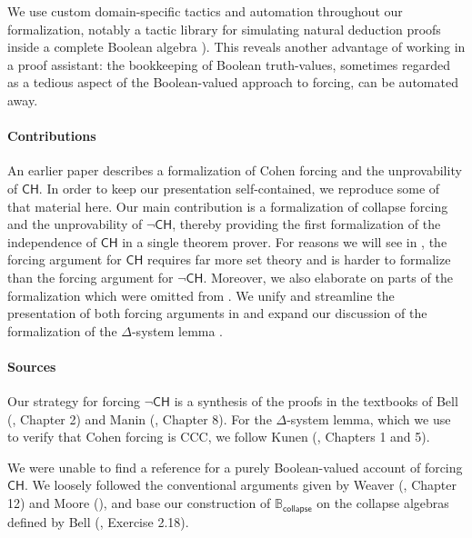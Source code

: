 \documentclass[sigplan,10pt,review, anonymous]{acmart}
\newcommand{\CH}{\mathsf{CH}}
\theoremstyle{definition}
\begin{document}
We use custom domain-specific tactics and automation throughout our formalization, notably a tactic library for simulating natural deduction proofs inside a complete Boolean algebra ). This reveals another advantage of working in a proof assistant: the bookkeeping of Boolean truth-values, sometimes regarded as a tedious aspect of the Boolean-valued approach to forcing, can be automated away.

\paragraph{Contributions}
An earlier paper \cite{DBLP:conf/itp/HanD19} describes a formalization of Cohen forcing and the unprovability of \(\CH\). In order to keep our presentation self-contained, %
we reproduce some of that material here.
Our main contribution is a formalization of collapse forcing and the unprovability of \(\neg \CH\), thereby providing the first formalization of the independence of \(\CH\) in a single theorem prover. For reasons we will see in , the forcing argument for \(\CH\) requires far more set theory and is harder to formalize than the forcing argument for \(\neg \CH\). Moreover, we also elaborate on parts of the formalization which were omitted from \cite{DBLP:conf/itp/HanD19}. We unify and streamline the presentation of both forcing arguments in %
and expand our discussion of the formalization of the \(\Delta\)-system lemma .

\paragraph{Sources}
Our strategy for forcing \(\neg \CH\) is a synthesis of the proofs in the textbooks of Bell (\cite{bell2011set}, Chapter 2) and Manin (\cite{manin2009course}, Chapter 8).
For the $\Delta$-system lemma, which we use to verify that Cohen forcing is CCC, we follow Kunen (\cite{kunen2014set}, Chapters 1 and 5).

We were unable to find a reference for a purely Boolean-valued account of forcing \(\CH\). We loosely followed the conventional arguments given by Weaver (\cite{weaver2014forcing}, Chapter 12) and Moore (\cite{moore2019method}), and base our construction of \(\mathbb{B}_{\mathsf{collapse}}\) on the collapse algebras defined by Bell (\cite{bell2011set}, Exercise 2.18).
\end{document}
